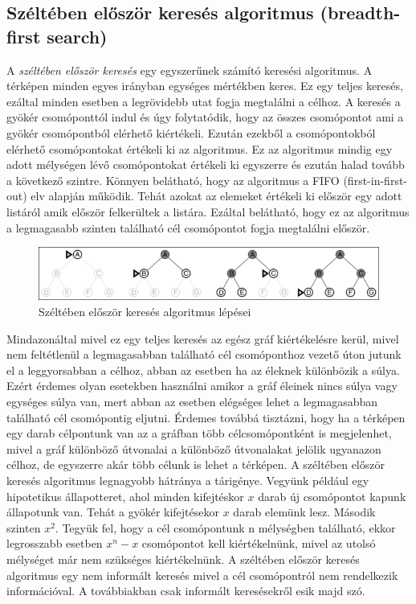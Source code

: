 \subsection{Széltében először keresés algoritmus (breadth-first search)}
A \textit{széltében először keresés} egy egyszerűnek számító keresési algoritmus. A térképen minden egyes irányban egységes mértékben keres. Ez egy teljes keresés, ezáltal minden esetben a legrövidebb utat fogja megtalálni a célhoz. A keresés a gyökér csomóponttól indul és úgy folytatódik, hogy az összes csomópontot ami a gyökér csomópontból elérhető kiértékeli. Ezután ezekből a csomópontokból elérhető csomópontokat értékeli ki az algoritmus. Ez az algoritmus mindig egy adott mélységen lévő csomópontokat értékeli ki egyszerre és ezután halad tovább a következő szintre. Könnyen belátható, hogy az algoritmus a FIFO (first-in-first-out) elv alapján működik. Tehát azokat az elemeket értékeli ki először egy adott listáról amik először felkerültek a listára. Ezáltal belátható, hogy ez az algoritmus a legmagasabb szinten található cél csomópontot fogja megtalálni először. 

\begin{figure}[h]
\centering
\includegraphics[scale=5.5]{kepek/img91.png}
\caption{Széltében először keresés algoritmus lépései}
\label{fig:img91}
\end{figure}

\noindent Mindazonáltal mivel ez egy teljes keresés az egész gráf kiértékelésre kerül, mivel nem feltétlenül a legmagasabban található cél csomóponthoz vezető úton jutunk el a leggyorsabban a célhoz, abban az esetben ha az éleknek különbözik a súlya. Ezért érdemes olyan esetekben használni amikor a gráf éleinek nincs súlya vagy egységes súlya van, mert abban az esetben elégséges lehet a legmagasabban található cél csomópontig eljutni.  Érdemes továbbá tisztázni, hogy ha a térképen egy darab célpontunk van az a gráfban több célcsomópontként is megjelenhet, mivel a gráf különböző útvonalai a különböző útvonalakat jelölik ugyanazon célhoz, de egyszerre akár több célunk is lehet a térképen.
\newline
\newline A széltében először keresés algoritmus legnagyobb hátránya a tárigénye. Vegyünk például egy hipotetikus állapotteret, ahol minden kifejtéskor $x$ darab új csomópontot kapunk állapotunk van. Tehát a gyökér kifejtésekor $x$ darab elemünk lesz. Második szinten $x^2$. Tegyük fel, hogy a cél csomópontunk n mélységben található, ekkor legrosszabb esetben $x^n - x$ csomópontot kell kiértékelnünk, mivel az utolsó mélységet már nem szükséges kiértékelnünk. 
\newline
\newline A széltében először keresés algoritmus egy nem informált keresés mivel a cél csomópontról nem rendelkezik információval. A továbbiakban csak informált keresésekről esik majd szó.

